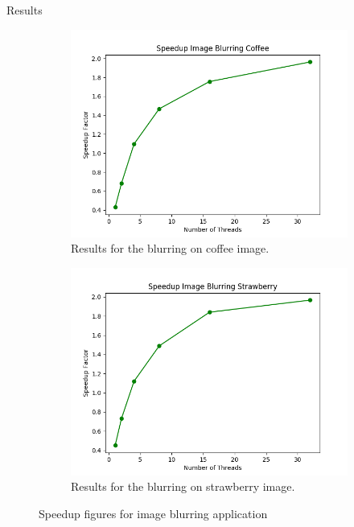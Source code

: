 \documentclass{article}
\begin{document}
Results

\begin{figure}[!htb]
    \centering
    \begin{subfigure}{.45\textwidth}
        \centering
        \includegraphics[width=1\linewidth]{./img/speedup_part_1_A.png}
        \caption{Results for the blurring on coffee image.}
    \end{subfigure} 
    \begin{subfigure}{.45\textwidth}
        \centering
        \includegraphics[width=1\linewidth]{./img/speedup_part_1_A_strawberry.png}
        \caption{Results for the blurring on strawberry image.}
    \end{subfigure}
    \caption{Speedup figures for image blurring application}
\end{figure}   
\end{document}
